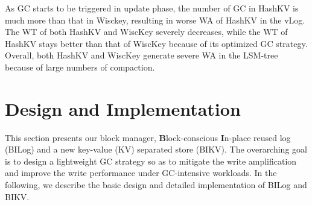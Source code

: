 \documentclass[sigconf]{acmart}
\begin{document}
As GC starts to be triggered in update phase, the number of GC in HashKV is much more than that in Wisckey, resulting in worse WA of HashKV in the vLog. The WT of both HashKV and WiscKey severely decreases, while the WT of HashKV stays better than that of WiscKey because of its optimized GC strategy. Overall, both HashKV and WiscKey generate severe WA in the LSM-tree because of large numbers of compaction. 



\section{Design and Implementation} \label{design}
This section presents our block manager, \textbf{B}lock-conscious \textbf{I}n-place reused log (BILog) and a new key-value (KV) separated store (BIKV). The overarching goal is to design a lightweight GC strategy so as to mitigate the write amplification and improve the write performance under GC-intensive workloads. In the following, we describe the basic design and detailed implementation of BILog and BIKV.

\end{document}
